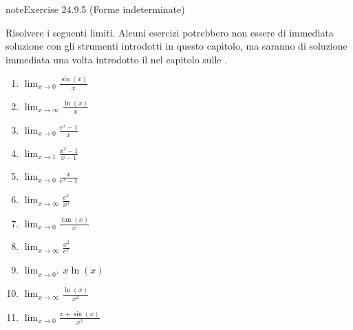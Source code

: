 \documentclass[letterpaper,10pt,italian]{jupyterBook}
\begin{document}
\begin{sphinxadmonition}{note}{Exercise 24.9.5 (Forme indeterminate)}





\sphinxAtStartPar
Risolvere i seguenti limiti. Alcuni esercizi potrebbero non essere di immediata soluzione con gli strumenti introdotti in questo capitolo, ma saranno di soluzione immediata una volta introdotto il {\hyperref[\detokenize{ch/infinitesimal_calculus/derivatives:infinitesimal-calculus-derivatives-thm-hopital}]{}} nel capitolo sulle {\hyperref[\detokenize{ch/infinitesimal_calculus/derivatives:infinitesimal-calculus-derivatives}]{}}.
\begin{enumerate}
%
\item {} 
\sphinxAtStartPar
\(\lim_{x \to 0} \frac{\sin(x)}{x}\)

\item {} 
\sphinxAtStartPar
\(\lim_{x \to \infty} \frac{\ln(x)}{x}\)

\item {} 
\sphinxAtStartPar
\(\lim_{x \to 0} \frac{e^x - 1}{x}\)

\item {} 
\sphinxAtStartPar
\(\lim_{x \to 1} \frac{x^2 - 1}{x - 1}\)

\item {} 
\sphinxAtStartPar
\(\lim_{x \to 0} \frac{x}{e^x - 1}\)

\item {} 
\sphinxAtStartPar
\(\lim_{x \to \infty} \frac{e^x}{x^2}\)

\item {} 
\sphinxAtStartPar
\(\lim_{x \to 0} \frac{\tan(x)}{x}\)

\item {} 
\sphinxAtStartPar
\(\lim_{x \to \infty} \frac{x^2}{e^x}\)

\item {} 
\sphinxAtStartPar
\(\lim_{x \to 0^+} x \ln(x)\)

\item {} 
\sphinxAtStartPar
\(\lim_{x \to \infty} \frac{\ln(x)}{x^2}\)

\item {} 
\sphinxAtStartPar
\(\lim_{x \to 0} \frac{x + \sin(x)}{x^2}\)

\end{enumerate}
\end{sphinxadmonition}
\end{document}
